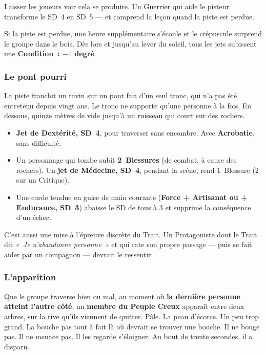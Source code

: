 \documentclass[10pt,a4paper]{article}
\newcommand{\tightlist}{\setlength{\itemsep}{0pt}\setlength{\parskip}{0pt}}
\begin{document}
Laissez les joueurs voir cela se produire. Un Guerrier qui aide le pisteur transforme le SD~4 en SD~5 --- et comprend la leçon quand la piste est perdue.

Si la piste est perdue, une heure supplémentaire s’écoule et le crépuscule surprend le groupe dans le bois. Dès lors et jusqu’au lever du soleil, tous les jets subissent une \textbf{Condition~: $-1$ degré}.

\subsubsection{Le pont pourri}\label{le-pont-pourri}

La piste franchit un ravin sur un pont fait d’un seul tronc, qui n’a pas été entretenu depuis vingt ans. Le tronc ne supporte qu’une personne à la fois. En dessous, quinze mètres de vide jusqu’à un ruisseau qui court sur des rochers.

\begin{itemize}
\tightlist
\item
  \textbf{Jet de Dextérité, SD~4}, pour traverser sans encombre. Avec \textbf{Acrobatie}, sans difficulté.
\item
  Un personnage qui tombe subit \textbf{2~Blessures} (de combat, à cause des rochers). Un \textbf{jet de Médecine, SD~4}, pendant la scène, rend 1~Blessure (2 sur un Critique).
\item
  Une corde tendue en guise de main courante (\textbf{Force + Artisanat ou + Endurance, SD~3}) abaisse le SD de tous à 3 et supprime la conséquence d’un échec.
\end{itemize}

C’est aussi une mise à l’épreuve discrète du Trait. Un Protagoniste dont le Trait dit \emph{«~Je n’abandonne personne~»} et qui rate son propre passage --- puis se fait aider par un compagnon --- devrait le ressentir.

\subsubsection{L’apparition}\label{lapparition}

Que le groupe traverse bien ou mal, au moment où \textbf{la dernière personne atteint l’autre côté}, un \textbf{membre du Peuple Creux} apparaît entre deux arbres, sur la rive qu’ils viennent de quitter. Pâle. La peau d’écorce. Un peu trop grand. La bouche pas tout à fait là où devrait se trouver une bouche. Il ne bouge pas. Il ne menace pas. Il les regarde s’éloigner. Au bout de trente secondes, il a disparu.
\end{document}
